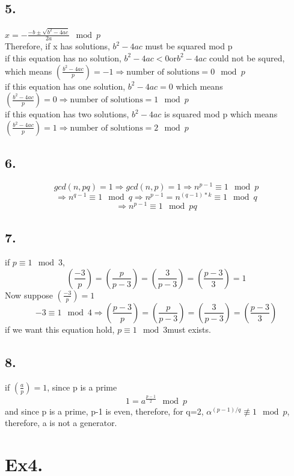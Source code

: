 \documentclass[a4paper,12pt]{journal}
\begin{document}
	 \subsection*{5. }
	 $x=-\frac{-b\pm\sqrt{b^2-4ac}}{2a}\mod p$\\
	 Therefore, if x has solutions, $b^2-4ac$ must be squared mod p\\
	 if this equation has no solution, $b^2-4ac<0$or$b^2-4ac$ could not be squred, which means $\left(\frac{b^2-4ac}{p}\right)=-1\Rightarrow \text{number of solutions} = 0\mod p$ \\
	  if this equation has one solution, $b^2-4ac=0$  which means\\ $\left(\frac{b^2-4ac}{p}\right)=0\Rightarrow \text{number of solutions} = 1\mod p$ \\
	  if this equation has two solutions, $b^2-4ac$ is squared mod p which means\\ $\left(\frac{b^2-4ac}{p}\right)=1\Rightarrow \text{number of solutions} = 2\mod p$ \\
	 \subsection*{6. }
	 $$gcd(n,pq)=1\Rightarrow gcd(n,p)=1\Rightarrow n^{p-1}\equiv 1 \mod p$$
	 $$\Rightarrow n^{q-1}\equiv 1\mod q\Rightarrow n^{p-1}=n^{(q-1)*k}\equiv 1\mod q$$
	 $$\Rightarrow n^{p-1}\equiv 1\mod pq$$
	 \subsection*{7.}
	 if $p\equiv 1\mod 3$, \\
	 $$\left(\frac{-3}{p}\right)=\left(\frac{p}{p-3}\right)=\left(\frac{3}{p-3}\right)=\left(\frac{p-3}{3}\right)=1$$
	 Now suppose $\left(\frac{-3}{p}\right)=1$\\
	 $$-3\equiv 1 \mod 4\Rightarrow \left(\frac{p-3}{p}\right)=\left(\frac{p}{p-3}\right)=\left(\frac{3}{p-3}\right)=\left(\frac{p-3}{3}\right)$$
	 if we want this equation hold, $p\equiv 1\mod 3$must exists.
	 \subsection*{8.}
	 if $\left(\frac{a}{p}\right)=1$, since p is a prime\\
	 $$1=a^{\frac{p-1}{2}}\mod p$$
	 and since p is a prime, p-1 is  even, therefore, for q=2, $\alpha^{(p-1)/q}\not\equiv1\mod p$, therefore, a is not a generator.
	 \section*{Ex4. }
\end{document}
